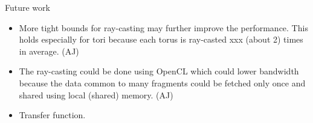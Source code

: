 Future work
\begin{itemize}
  \item More tight bounds for ray-casting may further improve the performance. This holds especially for tori because each torus is ray-casted xxx (about 2) times in average. (AJ)
  \item The ray-casting could be done using OpenCL which could lower bandwidth because the data common to many fragments could be fetched only once and shared using local (shared) memory. (AJ)
	\item Transfer function.
\end{itemize}